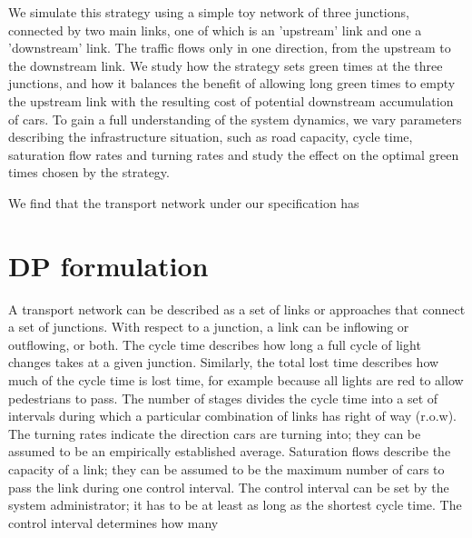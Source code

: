 \documentclass[11pt]{article}
\begin{document}
We simulate this strategy using a simple toy network of three junctions, connected by two main links, one of which is an 'upstream' link and one a 'downstream' link. The traffic flows only in one direction, from the upstream to the downstream link. We study how the strategy sets green times at the three junctions, and how it balances the benefit of allowing long green times to empty the upstream link with the resulting cost of potential downstream accumulation of cars. To gain a full understanding of the system dynamics, we vary parameters describing the infrastructure situation, such as road capacity, cycle time, saturation flow rates and turning rates and study the effect on the optimal green times chosen by the strategy.

We find that the transport network under our specification has 

\section{DP formulation}
A transport network can be described as a set of links or approaches that connect a set of junctions. With respect to a junction, a link can be inflowing or outflowing, or both. The cycle time describes how long a full cycle of light changes takes at a given junction. Similarly, the total lost time describes how much of the cycle time is lost time, for example because all lights are red to allow pedestrians to pass. The number of stages divides the cycle time into a set of intervals during which a particular combination of links has right of way (r.o.w). The turning rates indicate the direction cars are turning into; they can be assumed to be an empirically established average. Saturation flows describe the capacity of a link; they can be assumed to be the maximum number of cars to pass the link during one control interval. The control interval can be set by the system administrator; it has to be at least as long as the shortest cycle time. The control interval determines how many
\end{document}
